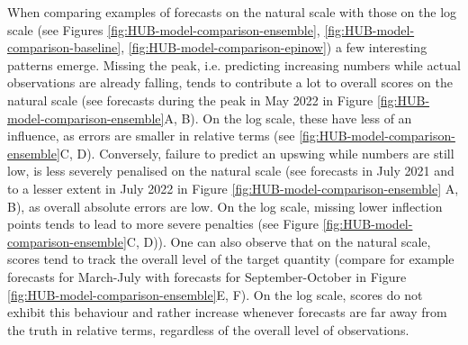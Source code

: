\documentclass{article}
\begin{document}
When comparing examples of forecasts on the natural scale with those on the log scale (see Figures \ref{fig:HUB-model-comparison-ensemble}, \ref{fig:HUB-model-comparison-baseline}, \ref{fig:HUB-model-comparison-epinow}) a few interesting patterns emerge. Missing the peak, i.e. predicting increasing numbers while actual observations are already falling, tends to contribute a lot to overall scores on the natural scale (see forecasts during the peak in May 2022 in Figure \ref{fig:HUB-model-comparison-ensemble}A, B). On the log scale, these have less of an influence, as errors are smaller in relative terms (see \ref{fig:HUB-model-comparison-ensemble}C, D). Conversely, failure to predict an upswing while numbers are still low, is less severely penalised on the natural scale (see forecasts in July 2021 and to a lesser extent in July 2022 in Figure \ref{fig:HUB-model-comparison-ensemble} A, B), as overall absolute errors are low. On the log scale, missing lower inflection points tends to lead to more severe penalties (see Figure \ref{fig:HUB-model-comparison-ensemble}C, D)). One can also observe that on the natural scale, scores tend to track the overall level of the target quantity (compare for example forecasts for March-July with forecasts for September-October in Figure \ref{fig:HUB-model-comparison-ensemble}E, F). On the log scale, scores do not exhibit this behaviour and rather increase whenever forecasts are far away from the truth in relative terms, regardless of the overall level of observations. 
\end{document}
